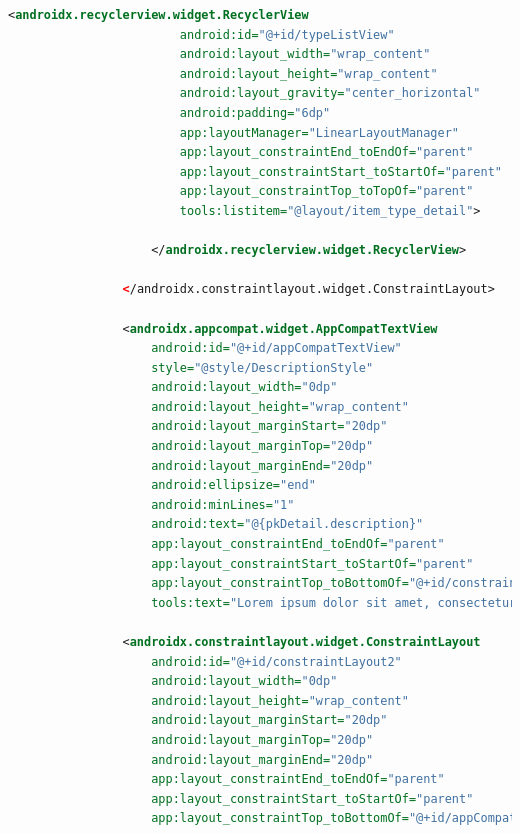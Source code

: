 \documentclass[a4paper, 12pt]{article}
\begin{document}
\begin{lstlisting}[caption={Pokemon Detail Layout.}, label={layout:pk_detail}, language=XML]
                    <androidx.recyclerview.widget.RecyclerView
                        android:id="@+id/typeListView"
                        android:layout_width="wrap_content"
                        android:layout_height="wrap_content"
                        android:layout_gravity="center_horizontal"
                        android:padding="6dp"
                        app:layoutManager="LinearLayoutManager"
                        app:layout_constraintEnd_toEndOf="parent"
                        app:layout_constraintStart_toStartOf="parent"
                        app:layout_constraintTop_toTopOf="parent"
                        tools:listitem="@layout/item_type_detail">
    
                    </androidx.recyclerview.widget.RecyclerView>
    
                </androidx.constraintlayout.widget.ConstraintLayout>
    
                <androidx.appcompat.widget.AppCompatTextView
                    android:id="@+id/appCompatTextView"
                    style="@style/DescriptionStyle"
                    android:layout_width="0dp"
                    android:layout_height="wrap_content"
                    android:layout_marginStart="20dp"
                    android:layout_marginTop="20dp"
                    android:layout_marginEnd="20dp"
                    android:ellipsize="end"
                    android:minLines="1"
                    android:text="@{pkDetail.description}"
                    app:layout_constraintEnd_toEndOf="parent"
                    app:layout_constraintStart_toStartOf="parent"
                    app:layout_constraintTop_toBottomOf="@+id/constraintLayout"
                    tools:text="Lorem ipsum dolor sit amet, consectetur adipiscing elit. Sed malesuada enim ac dapibus ornare. Nam imperdiet, turpis eget hendrerit viverra, nulla elit iaculis nibh, eget facilisis mi lorem at augue. Sed quis consectetur lacus, aliquet laoreet nisl. In quis sem tellus. Maecenas tincidunt viverra nisl, sed porta nibh semper ac. Phasellus in lacus at eros lacinia scelerisque sed vitae justo. Fusce mauris tellus, euismod et ultrices id, maximus nec odio. Maecenas ac venenatis sapien. Maecenas vitae vehicula ligula. Nam ac malesuada turpis."></androidx.appcompat.widget.AppCompatTextView>
    
                <androidx.constraintlayout.widget.ConstraintLayout
                    android:id="@+id/constraintLayout2"
                    android:layout_width="0dp"
                    android:layout_height="wrap_content"
                    android:layout_marginStart="20dp"
                    android:layout_marginTop="20dp"
                    android:layout_marginEnd="20dp"
                    app:layout_constraintEnd_toEndOf="parent"
                    app:layout_constraintStart_toStartOf="parent"
                    app:layout_constraintTop_toBottomOf="@+id/appCompatTextView">
    

\end{lstlisting}
\end{document}
